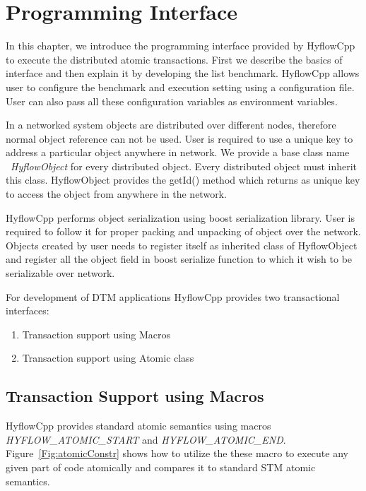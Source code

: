 \documentclass[12pt,english]{report}
\begin{document}
\chapter{Programming Interface}\label{chap:progInterface}

In this chapter, we introduce the programming interface provided by HyflowCpp to execute the distributed atomic transactions. First we describe the basics of interface and then explain it by developing the list benchmark. HyflowCpp allows user to configure the benchmark and execution setting using a configuration file. User can also pass all these configuration variables as environment variables.

In a networked system objects are distributed over different nodes, therefore normal object reference can not be used. User is required to use a unique key to address a particular object anywhere in network. We provide a base class name ~\emph{HyflowObject} for every distributed object. Every distributed object must inherit this class. HyflowObject provides the getId() method which returns as unique key to access the object from anywhere in the network.

HyflowCpp performs object serialization using boost serialization library. User is required to follow it for proper packing and unpacking of object over the network. Objects created by user needs to register itself as inherited class of HyflowObject and register all the object field in boost serialize function to which it wish to be serializable over network.

For development of DTM applications HyflowCpp provides two transactional interfaces: 
\begin{enumerate}
\item Transaction support using Macros
\item Transaction support using Atomic class 
\end{enumerate}

\section{Transaction Support using Macros}

HyflowCpp provides standard atomic semantics using macros \emph{HYFLOW{\_}ATOMIC{\_}START} and \emph{HYFLOW{\_}ATOMIC{\_}END}. Figure~\ref{Fig:atomicConstr} shows how to utilize the these macro to execute any given part of code atomically and compares it to standard STM atomic semantics. 
\end{document}
